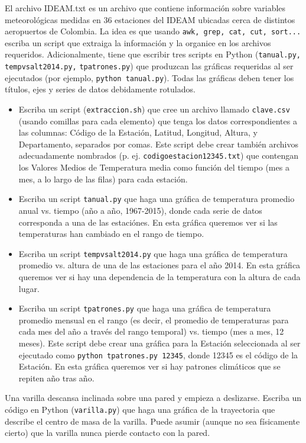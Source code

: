 \documentclass[11pt,letterpaper]{exam}
\begin{document}
\begin{questions}



El archivo IDEAM.txt es un archivo que contiene información sobre variables meteorol\'ogicas medidas en 36 estaciones del IDEAM ubicadas cerca de distintos aeropuertos de Colombia. La idea es que usando \texttt{awk, grep, cat, cut, sort...} escriba un script que extraiga la informaci\'on y la organice en los archivos requeridos. Adicionalmente, tiene que escribir tres scripts en Python (\verb"tanual.py, tempvsalt2014.py,"  \verb"tpatrones.py") que produzcan las gr\'aficas requeridas al ser ejecutados (por ejemplo, \texttt{python tanual.py}). Todas las gr\'aficas deben tener los t\'itulos, ejes y series de datos debidamente rotulados.

\begin{itemize}
	\item Escriba un script (\texttt{extraccion.sh}) que cree un archivo llamado \verb"clave.csv" (usando comillas para cada elemento) que tenga los datos correspondientes a las columnas: C\'odigo de la Estaci\'on, Latitud, Longitud, Altura, y Departamento, separados por comas. Este script debe crear tambi\'en archivos adecuadamente nombrados (p. ej. \texttt{codigoestacion12345.txt}) que contengan los Valores Medios de Temperatura media como función del tiempo (mes a mes, a lo largo de las filas) para cada estaci\'on. 
	\item Escriba un script \texttt{tanual.py} que haga una gr\'afica de temperatura promedio anual vs. tiempo (año a año, 1967-2015), donde cada serie de datos corresponda a una de las estaci\'ones. En esta gr\'afica queremos ver si las temperaturas han cambiado en el rango de tiempo.
	\item Escriba un script \texttt{tempvsalt2014.py} que haga una gr\'afica de temperatura promedio vs. altura de una de las estaciones para el año 2014. En esta gr\'afica queremos ver si hay una dependencia de la temperatura con la altura de cada lugar.
	\item Escriba un script \texttt{tpatrones.py} que haga una gráfica de temperatura promedio mensual en el rango (es decir, el promedio de temperaturas para cada mes del año a trav\'es del rango temporal) vs. tiempo (mes a mes, 12 meses). Este script debe crear una gr\'afica para la Estaci\'on seleccionada al ser ejecutado como \texttt{python tpatrones.py 12345}, donde 12345 es el c\'odigo de la Estaci\'on. En esta gr\'afica queremos ver si hay patrones clim\'aticos que se repiten año tras año. 


\end{itemize}
 

Una varilla descansa inclinada sobre una pared y empieza a
deslizarse. Escriba un c\'odigo en Python (\verb"varilla.py") que haga
una gr\'afica de la trayectoria que describe el centro de masa de la
varilla. Puede asumir (aunque no sea f\'isicamente cierto) que la
varilla nunca pierde contacto con la pared. 

 

\end{questions}
\end{document}
